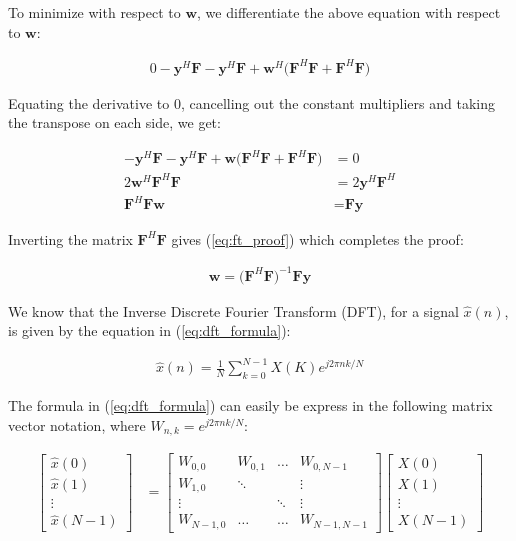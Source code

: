 \noindent{}To minimize with respect to $\textbf{w}$, we differentiate the above equation with respect to $\textbf{w}$:

\begin{align*}
0 -\textbf{y}^H\textbf{F} - \textbf{y}^H\textbf{F} + \textbf{w}^H\big(\textbf{F}^H\textbf{F}+\textbf{F}^H\textbf{F}\big)
\end{align*}

\noindent{}Equating the derivative to 0, cancelling out the constant multipliers and taking the transpose on each side, we get:

\begin{align*}
-\textbf{y}^H\textbf{F} - \textbf{y}^H\textbf{F} + \textbf{w}\big(\textbf{F}^H\textbf{F}+\textbf{F}^H\textbf{F}\big) &= 0 \\
2 \textbf{w}^H\textbf{F}^H\textbf{F} &= 2\textbf{y}^H\textbf{F}^H\\
\textbf{F}^H\textbf{F} \textbf{w} &= \textbf{F}\textbf{y}
\end{align*}

\noindent{}Inverting the matrix $\textbf{F}^H\textbf{F}$ gives (\ref{eq:ft_proof}) which completes the proof:

\begin{align}
\textbf{w} = \big(\textbf{F}^H\textbf{F}\big)^{-1} \textbf{F}\textbf{y} \label{eq:ft_proof}
\end{align}

\noindent{}We know that the Inverse Discrete Fourier Transform (DFT), for a signal $\hat{x}(n)$, is given by the equation in (\ref{eq:dft_formula}):

\begin{align}
\hat{x}(n) = \frac{1}{N} \sum_{k=0}^{N-1}X(K)e^{j2\pi n k / N} \label{eq:dft_formula}
\end{align}

\noindent{}The formula in (\ref{eq:dft_formula}) can easily be express in the following matrix vector notation, where $W_{n,k}=e^{j2\pi n k / N}$:

\begin{align*}
\begin{bmatrix}
\hat{x}(0) \\
\hat{x}(1) \\
\vdots\\
\hat{x}(N-1)
\end{bmatrix}
&=
\begin{bmatrix}
    W_{0,0}		& W_{0,1} 	& \dots	& W_{0,N-1} \\
    W_{1,0} 		& \ddots  	&		& \vdots		\\
   	\vdots		& 			& \ddots	& \vdots		\\
   	W_{N-1,0} 	& \dots 		& \dots	& W_{N-1,N-1}
\end{bmatrix} 
\begin{bmatrix}
X(0) \\
X(1) \\
\vdots \\
X(N-1)
\end{bmatrix}
\end{align*}

